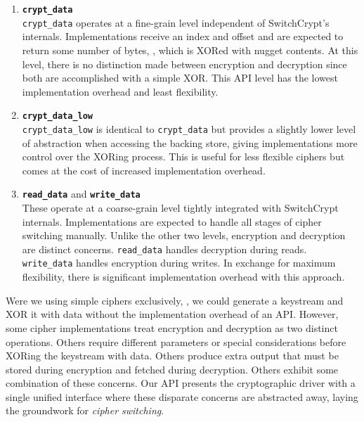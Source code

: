 \begin{enumerate}
   \item \textbf{\texttt{crypt\_data}}\\\texttt{crypt\_data}
   operates at a fine-grain level independent of SwitchCrypt's internals.
   Implementations receive an index and offset and are expected to return some
   number of bytes, , which is XORed with nugget contents. At
   this level, there is no distinction made between encryption and decryption
   since both are accomplished with a simple XOR. This API level has the lowest
   implementation overhead and least flexibility.

   \item \textbf{\texttt{crypt\_data\_low}}\\\texttt{crypt\_data\_low}
   is identical to \texttt{crypt\_data} but provides a slightly lower level of
   abstraction when accessing the backing store, giving implementations more
   control over the XORing process. This is useful for less flexible ciphers but
   comes at the cost of increased implementation overhead.

   \item \textbf{\texttt{read\_data}} and \textbf{\texttt{write\_data}}\\
   These operate at a coarse-grain level tightly integrated with SwitchCrypt
   internals. Implementations are expected to handle all stages of cipher
   switching manually. Unlike the other two levels, encryption and decryption
   are distinct concerns. \texttt{read\_data} handles decryption during reads.
   \texttt{write\_data} handles encryption during writes. In exchange for
   maximum flexibility, there is significant implementation overhead with this
   approach.
\end{enumerate}

Were we using simple ciphers exclusively, , we could generate a keystream and XOR it with data without the
implementation overhead of an API. However, some cipher implementations treat
encryption and decryption as two distinct operations. Others require different
parameters or special considerations before XORing the keystream with data.
Others produce extra output that must be stored during encryption and fetched
during decryption. Others exhibit some combination of these concerns. Our API
presents the cryptographic driver with a single unified interface where these
disparate concerns are abstracted away, laying the groundwork for
\emph{cipher switching}.

